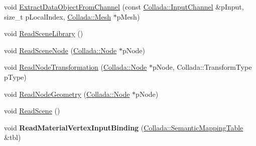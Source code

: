 \begin{DoxyCompactItemize}
\item 
void \hyperlink{class_assimp_1_1_collada_parser_aaa62c97eb41ea0791b48d280ca187ead}{Extract\+Data\+Object\+From\+Channel} (const \hyperlink{struct_assimp_1_1_collada_1_1_input_channel}{Collada\+::\+Input\+Channel} \&p\+Input, size\+\_\+t p\+Local\+Index, \hyperlink{struct_assimp_1_1_collada_1_1_mesh}{Collada\+::\+Mesh} $\ast$p\+Mesh)
\item 
void \hyperlink{class_assimp_1_1_collada_parser_a752dff96135606767463d3bc1097ef5b}{Read\+Scene\+Library} ()
\item 
void \hyperlink{class_assimp_1_1_collada_parser_a7d056e872b37fa305b2bd654b33798c3}{Read\+Scene\+Node} (\hyperlink{struct_assimp_1_1_collada_1_1_node}{Collada\+::\+Node} $\ast$p\+Node)
\item 
void \hyperlink{class_assimp_1_1_collada_parser_acb87aa2fff3dc4d11a1f205d339e893e}{Read\+Node\+Transformation} (\hyperlink{struct_assimp_1_1_collada_1_1_node}{Collada\+::\+Node} $\ast$p\+Node, Collada\+::\+Transform\+Type p\+Type)
\item 
void \hyperlink{class_assimp_1_1_collada_parser_ac35b135870cf8339a9e91b9ac48d153b}{Read\+Node\+Geometry} (\hyperlink{struct_assimp_1_1_collada_1_1_node}{Collada\+::\+Node} $\ast$p\+Node)
\item 
void \hyperlink{class_assimp_1_1_collada_parser_ad54b69580285d4d10d5f96a8a0c6d0a9}{Read\+Scene} ()
\item 
\hypertarget{class_assimp_1_1_collada_parser_abb399e111c89474a2aee10715d055638}{void {\bfseries Read\+Material\+Vertex\+Input\+Binding} (\hyperlink{struct_assimp_1_1_collada_1_1_semantic_mapping_table}{Collada\+::\+Semantic\+Mapping\+Table} \&tbl)}\label{class_assimp_1_1_collada_parser_abb399e111c89474a2aee10715d055638}


\end{DoxyCompactItemize}

